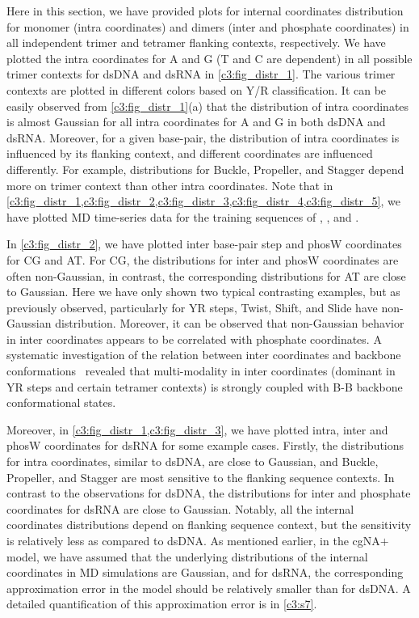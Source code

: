 Here in this section, we have provided plots for internal coordinates distribution for monomer (intra coordinates) and dimers (inter and phosphate coordinates) in all independent trimer and tetramer flanking contexts, respectively.
We have plotted the intra coordinates for A and G (T and C are dependent) in all possible trimer contexts for dsDNA and dsRNA in \cref{c3:fig_distr_1}.
The various trimer contexts are plotted in different colors based on Y/R classification. 
It can be easily observed from \cref{c3:fig_distr_1}(a) that the distribution of intra coordinates is almost Gaussian for all intra coordinates for A and G in both dsDNA and dsRNA. 
Moreover, for a given base-pair, the distribution of intra coordinates is influenced by its flanking context, and different coordinates are influenced differently. 
For example, distributions for Buckle, Propeller, and Stagger depend more on trimer context than other intra coordinates. Note that in \cref{c3:fig_distr_1,c3:fig_distr_2,c3:fig_distr_3,c3:fig_distr_4,c3:fig_distr_5}, we have plotted MD time-series data for the training sequences of \Lbdna, \Lbrna, and \Lbdrh.

In \cref{c3:fig_distr_2}, we have plotted inter base-pair step and phosW coordinates for CG and AT.
For CG, the distributions for inter and phosW coordinates are often non-Gaussian, in contrast, the corresponding distributions for AT are close to Gaussian.
Here we have only shown two typical contrasting examples, but as previously observed, particularly for YR steps, Twist, Shift, and Slide have non-Gaussian distribution. Moreover, it can be observed that non-Gaussian behavior in inter coordinates appears to be correlated with phosphate coordinates.
A systematic investigation of the relation between inter coordinates and backbone conformations~\cite{pasi2014muabc,dans2019static} revealed that multi-modality in inter coordinates (dominant in YR steps and certain tetramer contexts) is strongly coupled with B-B backbone conformational states.   

Moreover, in \cref{c3:fig_distr_1,c3:fig_distr_3}, we have plotted intra, inter and phosW coordinates for dsRNA for some example cases.
Firstly, the distributions for intra coordinates, similar to dsDNA, are close to Gaussian, and Buckle, Propeller, and Stagger are most sensitive to the flanking sequence contexts.
In contrast to the observations for dsDNA, the distributions for inter and phosphate coordinates for dsRNA are close to Gaussian.
Notably, all the internal coordinates distributions depend on flanking sequence context, but the sensitivity is relatively less as compared to dsDNA.
As mentioned earlier, in the cgNA$+$ model, we have assumed that the underlying distributions of the internal coordinates in MD simulations are Gaussian, and for dsRNA, the corresponding approximation error in the model should be relatively smaller than for dsDNA.
A detailed quantification of this approximation error is in \cref{c3:s7}.

